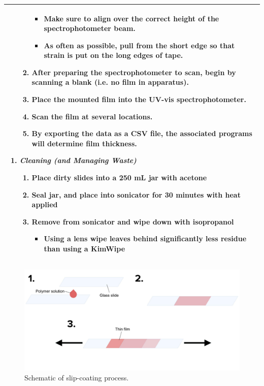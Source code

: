 \documentclass{article}
\begin{document}
\begin{center}
\begin{longtable}{ |p{\textwidth}| }
\begin{enumerate}[resume*=TE]
\begin{enumerate}
\begin{itemize}
			\item Make sure to align over the correct height of the spectrophotometer beam.
			\item As often as possible, pull from the short edge so that strain is put on the long edges of tape.
		\end{itemize}
		\item After preparing the spectrophotometer to scan, begin by scanning a blank (i.e. no film in apparatus).
		\item Place the mounted film into the UV-vis spectrophotometer.
		\item Scan the film at several locations.
		\item By exporting the data as a CSV file, the associated programs will determine film thickness.
	\end{enumerate}
\end{enumerate}
\begin{enumerate}[resume*=TE]
	\item \textit{Cleaning (and Managing Waste)}
	\begin{enumerate}
		\item Place dirty slides into a 250 mL jar with acetone
		\item Seal jar, and place into sonicator for 30 minutes with heat applied
		\item Remove from sonicator and wipe down with isopropanol
		\begin{itemize}
			\item Using a lens wipe leaves behind significantly less residue than using a KimWipe
		\end{itemize}
	\end{enumerate}
\end{enumerate}
\\ \hline
\end{longtable}
\end{center}

\begin{figure}[H]
	\centering
	\captionsetup{width=14cm}
	\includegraphics[width = 14cm]{schematic.jpg}
	\caption{Schematic of slip-coating process.}
\end{figure}
\end{document}
